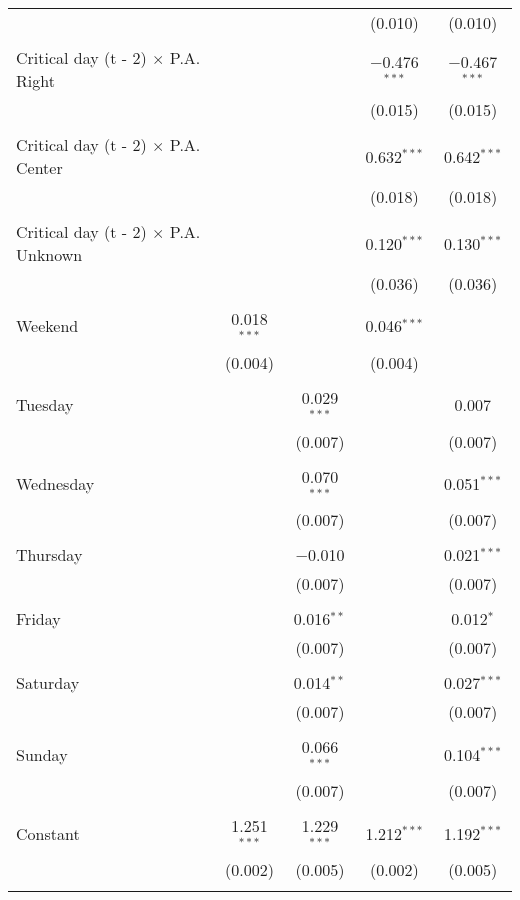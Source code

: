 \documentclass[
]{article}
\begin{document}
\begin{table}[!htbp]
{\begin{tabular}{@{\extracolsep{5pt}}lcccc}
  &  &  & (0.010) & (0.010) \\ 
  & & & & \\ 
 Critical day (t - 2) $\times$ P.A. Right &  &  & $-$0.476$^{***}$ & $-$0.467$^{***}$ \\ 
  &  &  & (0.015) & (0.015) \\ 
  & & & & \\ 
 Critical day (t - 2) $\times$ P.A. Center &  &  & 0.632$^{***}$ & 0.642$^{***}$ \\ 
  &  &  & (0.018) & (0.018) \\ 
  & & & & \\ 
 Critical day (t - 2) $\times$ P.A. Unknown &  &  & 0.120$^{***}$ & 0.130$^{***}$ \\ 
  &  &  & (0.036) & (0.036) \\ 
  & & & & \\ 
 Weekend & 0.018$^{***}$ &  & 0.046$^{***}$ &  \\ 
  & (0.004) &  & (0.004) &  \\ 
  & & & & \\ 
 Tuesday &  & 0.029$^{***}$ &  & 0.007 \\ 
  &  & (0.007) &  & (0.007) \\ 
  & & & & \\ 
 Wednesday &  & 0.070$^{***}$ &  & 0.051$^{***}$ \\ 
  &  & (0.007) &  & (0.007) \\ 
  & & & & \\ 
 Thursday &  & $-$0.010 &  & 0.021$^{***}$ \\ 
  &  & (0.007) &  & (0.007) \\ 
  & & & & \\ 
 Friday &  & 0.016$^{**}$ &  & 0.012$^{*}$ \\ 
  &  & (0.007) &  & (0.007) \\ 
  & & & & \\ 
 Saturday &  & 0.014$^{**}$ &  & 0.027$^{***}$ \\ 
  &  & (0.007) &  & (0.007) \\ 
  & & & & \\ 
 Sunday &  & 0.066$^{***}$ &  & 0.104$^{***}$ \\ 
  &  & (0.007) &  & (0.007) \\ 
  & & & & \\ 
 Constant & 1.251$^{***}$ & 1.229$^{***}$ & 1.212$^{***}$ & 1.192$^{***}$ \\ 
  & (0.002) & (0.005) & (0.002) & (0.005) \\ 
  & & & & \\ 

\end{tabular}}
\end{table}
\end{document}
